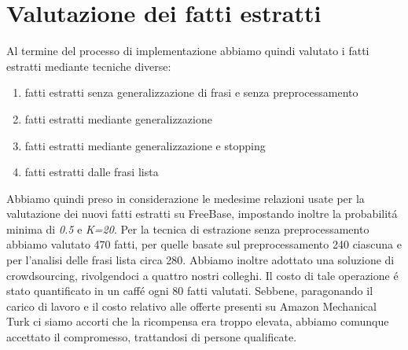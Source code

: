 \documentclass[twocolumn,10pt]{asme2ej}
\begin{document}
\section{Valutazione dei fatti estratti}
Al termine del processo di implementazione abbiamo quindi valutato i fatti estratti mediante tecniche diverse:
\begin{enumerate}
\item fatti estratti senza generalizzazione di frasi e senza preprocessamento
\item fatti estratti mediante generalizzazione
\item fatti estratti mediante generalizzazione e stopping
\item fatti estratti dalle frasi lista
\end{enumerate}
Abbiamo quindi preso in considerazione le medesime relazioni usate per la valutazione dei nuovi fatti estratti su FreeBase, impostando inoltre la probabilit\'a minima di \textit{0.5} e \textit{K=20}. Per la tecnica di estrazione senza preprocessamento abbiamo valutato 470 fatti, per quelle basate sul preprocessamento 240 ciascuna e per l'analisi delle frasi lista circa 280.  Abbiamo inoltre adottato una soluzione di crowdsourcing, rivolgendoci a quattro nostri colleghi. Il costo di tale operazione \'e stato quantificato  in un caff\'e ogni 80 fatti valutati. Sebbene, paragonando il carico di lavoro e il costo relativo alle offerte presenti su Amazon Mechanical Turk ci siamo accorti che la ricompensa era troppo elevata, abbiamo comunque accettato il compromesso, trattandosi di persone qualificate.
\end{document}
